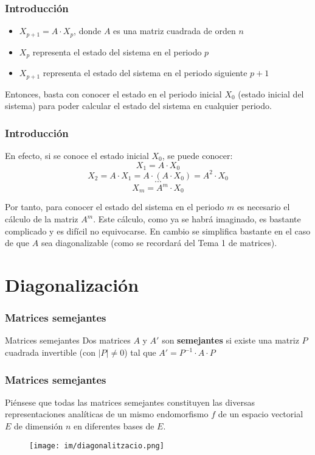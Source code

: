 \documentclass{beamer}
\begin{document}
\begin{frame}
\frametitle{Introducci\'on}
\begin{itemize}
\item $X_{p+1} = A\cdot X_p$, donde $A$ es una matriz cuadrada de orden $n$
\item$X_p$ representa el estado del sistema en el periodo $p$
\item $X_{p+1}$ representa el estado del sistema en el periodo siguiente $p+1$
\end{itemize}
Entonces, basta con conocer el estado en el periodo inicial $X_0$ (estado inicial del sistema) para poder calcular el estado del sistema en cualquier periodo.

\end{frame}

\begin{frame}
\frametitle{Introducci\'on}
En efecto, si se conoce el estado inicial $X_0$, se puede conocer:
\[X_1 = A\cdot X_0\]
\[X_2 = A\cdot X_1 = A\cdot (A\cdot X_0) = A^2\cdot X_0\]
\[\cdots\]
\[X_m = A^m \cdot X_0\]

Por tanto, para conocer el estado del sistema en el periodo $m$ es necesario el c\'alculo de la matriz $A^m$. Este c\'alculo, como ya se habr\'a imaginado, es bastante complicado y es dif\'icil no equivocarse. En cambio se simplifica bastante en el caso de que $A$ sea diagonalizable (como se recordar\'a del Tema 1 de matrices). 
\end{frame}

\section{Diagonalizaci\'on}

\begin{frame}
\frametitle{Matrices semejantes}
\begin{block}{Matrices semejantes}
Dos matrices $A$ y $A'$ son \textbf{semejantes} si existe una matriz $P$ cuadrada invertible (con $|P|\neq 0$) tal que $A' = P^{-1}\cdot A\cdot P$
\end{block}
\end{frame}

\begin{frame}
\frametitle{Matrices semejantes}
Pi\'ensese que todas las matrices semejantes constituyen las diversas representaciones anal\'iticas de un mismo endomorfismo $f$ de un espacio vectorial $E$ de dimensi\'on $n$ en diferentes bases de $E$.
\begin{figure}[h]
\label{diag}
\centering
\texttt{[image: im/diagonalitzacio.png]}
\end{figure}
\end{frame}
\end{document}

